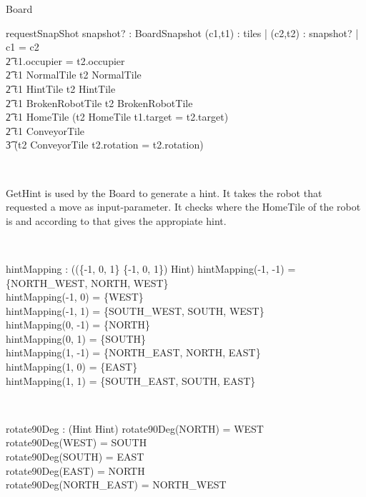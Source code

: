 \begin{class}{Board}
\begin{schema}{requestSnapShot}
snapshot? : BoardSnapshot
\where
\forall (c1,t1) : tiles | \exists (c2,t2) : snapshot? | c1 = c2 \: \wedge \\ \t2
t1.occupier = t2.occupier \: \wedge \\ \t2
t1 \in NormalTile \Rightarrow t2 \in NormalTile \: \wedge \\ \t2
t1 \in HintTile \Rightarrow t2 \in HintTile \: \wedge \\ \t2
t1 \in BrokenRobotTile \Rightarrow t2 \in BrokenRobotTile \: \wedge \\ \t2
t1 \in HomeTile \Rightarrow (t2 \in HomeTile \wedge t1.target = t2.target) \: \wedge \\ \t2
t1 \in ConveyorTile \Rightarrow \\ \t3 (t2 \in ConveyorTile \wedge t2.rotation = t2.rotation)
\end{schema} \\
\znewpage
\begin{classcom}
GetHint is used by the Board to generate a hint. It takes the robot that requested a move as input-parameter. It checks where the HomeTile of the robot is and according to that gives the appropiate hint.
\end{classcom} \\
\begin{axdef}
hintMapping : \power ((\{-1, 0, 1\} \cross \{-1, 0, 1\}) \pfun \power Hint)
\where
hintMapping(-1, -1) = \{NORTH\_WEST, NORTH, WEST\} \\
hintMapping(-1, 0) = \{WEST\} \\
hintMapping(-1, 1) = \{SOUTH\_WEST, SOUTH, WEST\} \\
hintMapping(0, -1) = \{NORTH\} \\
hintMapping(0, 1) = \{SOUTH\} \\
hintMapping(1, -1) = \{NORTH\_EAST, NORTH, EAST\} \\
hintMapping(1, 0) = \{EAST\} \\
hintMapping(1, 1) = \{SOUTH\_EAST, SOUTH, EAST\} \\
\end{axdef} \\
\begin{axdef}
rotate90Deg : \power (Hint \fun Hint)
\where
rotate90Deg(NORTH) = WEST \\
rotate90Deg(WEST) = SOUTH \\
rotate90Deg(SOUTH) = EAST \\
rotate90Deg(EAST) = NORTH \\
rotate90Deg(NORTH\_EAST) = NORTH\_WEST \\

\end{axdef}
\end{class}
